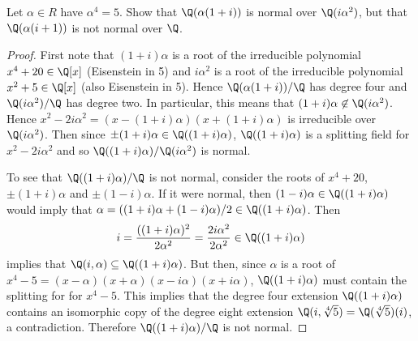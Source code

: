 \documentclass[10pt]{amsart}
\begin{document}
\begin{thm}
  Let $\alpha \in R$ have $\alpha^4 = 5$.
  Show that $\Q(\alpha(1 + i))$ is normal over $\Q(i\alpha^2)$, but that $\Q(\alpha(i + 1))$ is not normal over $\Q$.
  \begin{proof}
    First note that $(1 + i)\alpha$ is a root of the irreducible polynomial $x^4 + 20 \in \Q[x]$ (Eisenstein in 5) and $i\alpha^2$ is a root of the irreducible polynomial $x^2 + 5 \in \Q[x]$ (also Eisenstein in 5).
    Hence $\Q(\alpha(1 + i))/\Q$ has degree four and $\Q(i\alpha^2)/\Q$ has degree two.
    In particular, this means that $(1 + i)\alpha \not \in \Q(i\alpha^2)$.
    Hence $x^2 - 2i\alpha^2 = (x - (1 + i)\alpha)(x + (1 + i)\alpha)$ is irreducible over $\Q(i\alpha^2)$.
    Then since $\pm (1 + i)\alpha \in \Q((1 + i)\alpha)$, $\Q((1 + i)\alpha)$ is a splitting field for $x^2 - 2i\alpha^2$ and so $\Q((1 + i)\alpha)/\Q(i\alpha^2)$ is normal.
    
    To see that $\Q((1 + i)\alpha)/\Q$ is not normal, consider the roots of $x^4 + 20$, $\pm(1 + i)\alpha$ and $\pm(1 - i)\alpha$.
    If it were normal, then $(1 - i)\alpha \in \Q((1 + i)\alpha)$ would imply that $\alpha = ((1 + i)\alpha + (1 - i)\alpha)/2 \in \Q((1 + i)\alpha)$.
    Then
    $$i = \frac{((1 + i)\alpha)^2}{2\alpha^2} = \frac{2i\alpha^2}{2\alpha^2} \in \Q((1 + i)\alpha)$$
    implies that $\Q(i, \alpha) \subseteq \Q((1 + i)\alpha)$.
    But then, since $\alpha$ is a root of $x^4 - 5 = (x - \alpha)(x + \alpha)(x - i\alpha)(x + i\alpha)$, $\Q((1 + i)\alpha)$ must contain the splitting for for $x^4 - 5$.
    This implies that the degree four extension $\Q((1 + i)\alpha)$ contains an isomorphic copy of the degree eight extension $\Q(i, \sqrt[4]{5}) = \Q(\sqrt[4]{5})(i)$, a contradiction.
    Therefore $\Q((1 + i)\alpha)/\Q$ is not normal.
  \end{proof}
\end{thm}
\end{document}
